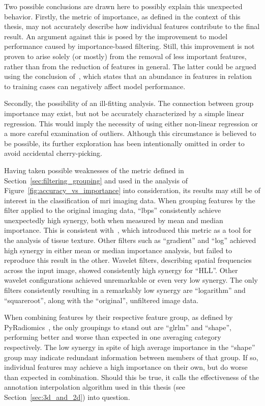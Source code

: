 Two possible conclusions are drawn here to possibly explain this unexpected 
behavior. Firstly, the metric of importance, as defined in the context of this
thesis, may not accurately describe how individual features contribute to the 
final result. An argument against this is posed by the improvement to model 
performance caused by importance-based filtering. Still, this improvement is not
proven to arise solely (or mostly) from the removal of less important features,
rather than from the reduction of features in general. The latter could be argued using
the conclusion of~\cite{considerations_of_sample_and_feature_size}, which 
states that an abundance in features in relation to training cases can 
negatively affect model performance.

Secondly, the possibility of an ill-fitting analysis. The connection between
group importance may exist, but not be accurately characterized by a simple 
linear regression. This would imply the necessity of using either 
non-linear regression or a more careful examination of outliers. Although this
circumstance is believed to be possible, its further exploration has been 
intentionally omitted in order to avoid accidental cherry-picking.

Having taken possible weaknesses of the metric defined in 
Section~\ref{sec:filtering_grouping} and used in the analysis of 
Figure~\ref{fig:accuracy_vs_importance} into consideration, its results may 
still be of interest in the classification of \ac{mri} imaging data.
When grouping features by the filter applied to the original imaging data, 
\enquote{\acp{lbp}} consistently achieve unexpectedly high synergy, both when measured by
mean and median importance. This is consistent with~\cite{local_binary_patterns},
which introduced this metric as a tool for the analysis of tissue texture.
Other filters such as \enquote{gradient} and \enquote{\ac{log}} achieved high synergy in either mean
or median importance analysis, but failed to reproduce this result in the other.
Wavelet filters, describing spatial frequencies across the input image, showed
consistently high synergy for \enquote{HLL}. Other wavelet configurations 
achieved unremarkable or even very low synergy. The only filters consistently 
resulting in a remarkably low synergy are \enquote{logarithm} and \enquote{squareroot}, along with 
the \enquote{original}, unfiltered image data.

When combining features by their respective feature group, as defined by 
PyRadiomics~\cite{py_rad}, the only groupings to stand out are \enquote{\ac{glrlm}}
and \enquote{shape}, performing better and worse than expected in one 
averaging category respectively. The low synergy in spite of high average 
importance in the \enquote{shape} group may indicate redundant information 
between members of that group. If so, individual features may achieve a high
importance on their own, but do worse than expected in combination. Should this
be true, it calls the effectiveness of the annotation interpolation algorithm
used in this thesis (see Section~\ref{sec:3d_and_2d}) into question.

